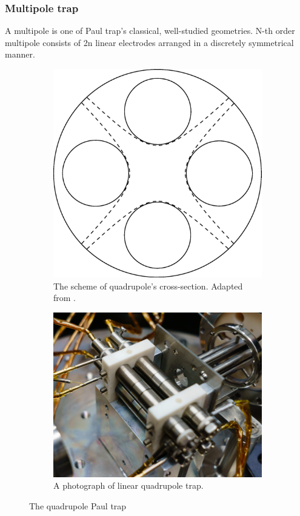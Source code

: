 \subsubsection{Multipole trap}
A multipole is one of Paul trap's classical, well-studied geometries. N-th order multipole consists of 2n linear electrodes arranged in a discretely symmetrical manner.
\begin{figure}[H]
\begin{subfigure}{.4\textwidth}
	\centering
	\includegraphics[width=\linewidth]{img/quadrupole_scheme.png}
	\caption{The scheme of quadrupole's cross-section. Adapted from \cite{FANGHANEL2017124}.}
	\label{fig:quadrupole scheme}
\end{subfigure}\hfill%
\begin{subfigure}{.47\textwidth}
	\centering
	\includegraphics[width=\linewidth]{img/quadrupole.png}
	\caption{A photograph of linear quadrupole trap.}
	\label{fig:quadrupole picture}
\end{subfigure}
\caption{The quadrupole Paul trap}
\label{fig:quadrupole}
\end{figure}
